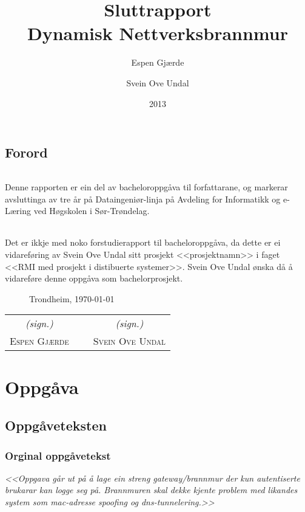 \documentclass[nynorsk,12pt,a4paper,oneside]{book}
\title{Sluttrapport \\ Dynamisk Nettverksbrannmur}
\author{Espen Gjærde \and Svein Ove Undal}
\date{2013}
\begin{document}

\frontmatter
\maketitle
\chapter{Forord}
\paragraph*{}
Denne rapporten er ein del av bacheloroppgåva til forfattarane, og markerar avsluttinga av tre år på Dataingeniør-linja på Avdeling for Informatikk og e-Læring ved Høgskolen i Sør-Trøndelag. 
\paragraph*{}
Det er ikkje med noko forstudierapport til bacheloroppgåva, da dette er ei vidareføring av Svein Ove Undal sitt prosjekt <<prosjektnamn>> i faget <<RMI med prosjekt i distibuerte systemer>>. Svein Ove Undal ønska då å vidareføre denne oppgåva som bachelorprosjekt. 
\begin{figure}[b]
Trondheim, \today
\vspace{1cm}
\end{figure}
\begin{table}[b!]
	\centering
	\begin{tabular}[c]{ c p{4cm} c } 
		\emph{(sign.)} & ~ & \emph{(sign.)} \\ 
		\cline{1-1} \cline{3-3}
		\parbox{5cm}{\centering \textsc{Espen Gjærde}}
		& & 
		\parbox{5cm}{\centering \textsc{Svein Ove Undal}} \\
	\end{tabular}
\end{table}

\part{Oppgåva}

\chapter{Oppgåveteksten}

\section{Orginal oppgåvetekst}
\emph{<<Oppgava går ut på å lage ein streng gateway/brannmur der kun autentiserte brukarar kan logge seg på. Brannmuren skal dekke kjente problem med likandes system som mac-adresse spoofing og dns-tunnelering.>>}
\end{document}

